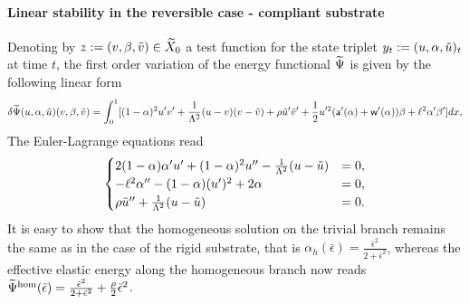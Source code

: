  \paragraph{Linear stability in the reversible case - compliant substrate}



Denoting by $z:=(v, \beta, \tilde v)\in \widetilde{X}_0$ a test function for the state triplet  $y_t:=(u, \alpha, \tilde u)_t$ at time $t$, the first order variation of the energy functional $\widetilde\Psi$ is given by the following linear form 
\begin{equation}
\delta \widetilde\Psi(u, \alpha, \tilde u)(v,\beta,\tilde v)=\int_0^1 [(1-\alpha)^2u'v'+\frac{1}{\Lambda^2} (u- v) (v- \tilde v)+\rho \tilde u'\tilde v'+\frac{1}{2}u'^2 (\mathsf{a}'(\alpha)+\mathsf{w}'(\alpha))\beta+\ell^2\alpha'\beta' ]dx,\label{firstvar}
\end{equation}
The Euler-Lagrange equations read
\begin{eqnarray}
\label{modeld_el_1}
\begin{cases}
  2(1-\alpha)\alpha' u' +(1-\alpha)^2 u'' -  \frac{1}{\Lambda^2}(u-\tilde u) &= 0, \\
  -\ell^2\alpha'' - (1-\alpha)( u')^2 + 2\alpha   &= 0,\\
    \rho  \tilde u''  +  \frac{1}{\Lambda^2}(u-\tilde u) &= 0. \\
\end{cases}
\label{auto2}
\end{eqnarray}
It is easy to show that the homogeneous solution on the trivial branch remains the same as in the case of the rigid substrate, that is $\alpha_h(\bar{\epsilon}) = \frac{\bar{\epsilon}^2}{2 + \bar{\epsilon}^2}\label{eq:homo11}$, whereas the effective elastic energy along the homogeneous branch now reads $\widetilde\Psi^\text{hom}(\bar{\epsilon}) = \frac{\bar{\epsilon}^2}{2 + \bar{\epsilon}^2} + \frac{\rho}{2}\bar{\epsilon}^2$.

